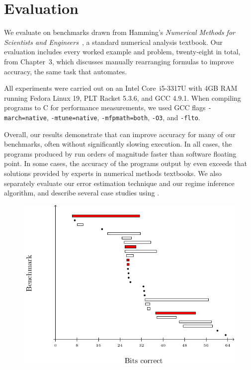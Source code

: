 \documentclass[paper.tex]{subfiles}
\begin{document}
\section{Evaluation}
\label{sec:evaluation}

We evaluate \casio on benchmarks drawn from Hamming's \emph{Numerical
  Methods for Scientists and Engineers}~\cite{book87-nmse}, a standard
numerical analysis textbook.  Our evaluation includes every worked
example and problem, twenty-eight in total, from Chapter~3, which
discusses manually rearranging formulas to improve accuracy, the same
task that \casio automates.

All experiments were carried out on an Intel Core~i5-3317U with 4GB
RAM running Fedora Linux 19, PLT Racket 5.3.6, and GCC 4.9.1.  When
compiling programs to C for performance measurements, we used GCC
flags \texttt{-march=native}, \texttt{-mtune=native},
\texttt{-mfpmath=both}, \texttt{-O3}, and \texttt{-flto}.

Overall, our results demonstrate that \casio can improve accuracy for
many of our benchmarks, often without significantly slowing execution.
In all cases, the programs produced by \casio run orders of magnitude
faster than software floating point.  In some cases, the accuracy of
the programs output by \casio even exceeds that solutions provided by
experts in numerical methods textbooks.  We also separately evaluate
our error estimation technique and our regime inference algorithm, and
describe several case studies using \casio.

\begin{figure}
\label{fig:eval-rect-f}
\includegraphics[width=0.9\columnwidth]{fig/eval-rect-f.pdf}
\caption{}
\end{figure}
\end{document}
